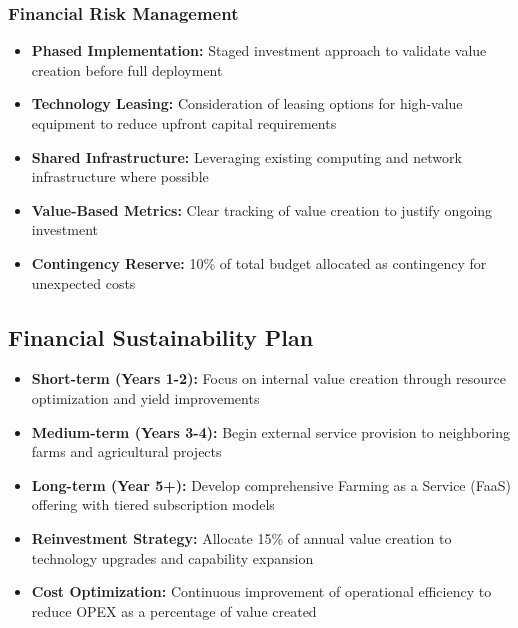 \subsubsection{Financial Risk Management}
\begin{itemize}
    \item \textbf{Phased Implementation:} Staged investment approach to validate value creation before full deployment
    
    \item \textbf{Technology Leasing:} Consideration of leasing options for high-value equipment to reduce upfront capital requirements
    
    \item \textbf{Shared Infrastructure:} Leveraging existing computing and network infrastructure where possible
    
    \item \textbf{Value-Based Metrics:} Clear tracking of value creation to justify ongoing investment
    
    \item \textbf{Contingency Reserve:} 10\% of total budget allocated as contingency for unexpected costs
\end{itemize}

\subsection{Financial Sustainability Plan}
\begin{itemize}
    \item \textbf{Short-term (Years 1-2):} Focus on internal value creation through resource optimization and yield improvements
    
    \item \textbf{Medium-term (Years 3-4):} Begin external service provision to neighboring farms and agricultural projects
    
    \item \textbf{Long-term (Year 5+):} Develop comprehensive Farming as a Service (FaaS) offering with tiered subscription models
    
    \item \textbf{Reinvestment Strategy:} Allocate 15\% of annual value creation to technology upgrades and capability expansion
    
    \item \textbf{Cost Optimization:} Continuous improvement of operational efficiency to reduce OPEX as a percentage of value created
\end{itemize} 